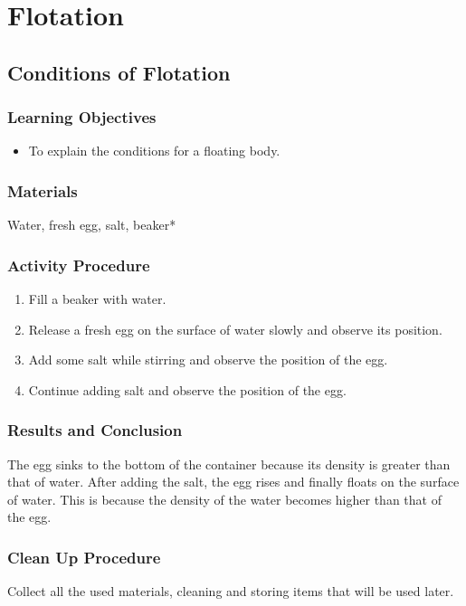 \section{Flotation}

\subsection{Conditions of Flotation}

\subsubsection*{Learning Objectives}
\begin{itemize}
\item{To explain the conditions for a floating body.} 
\end{itemize}

\subsubsection*{Materials}
Water, fresh egg, salt, beaker*

\subsubsection*{Activity Procedure}
\begin{enumerate}
\item{Fill a beaker with water.} 
\item{Release a fresh egg on the surface of water slowly and observe its position.} 
\item{Add some salt while stirring and observe the position of the egg.} 
\item{Continue adding salt and observe the position of the egg.} 
\end{enumerate}

\subsubsection*{Results and Conclusion}
The egg sinks to the bottom of the container because its density is greater than that of water. After adding the salt, the egg rises and finally floats on the surface of water. This is because the density of the water becomes higher than that of the egg.  

\subsubsection*{Clean Up Procedure}
Collect all the used materials, cleaning and storing items that will be used later.

